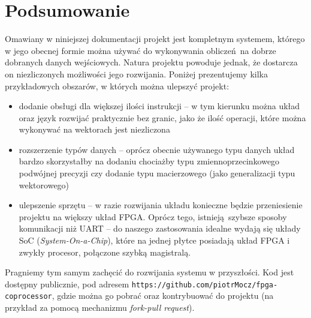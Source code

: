 \section{Podsumowanie}

Omawiany w niniejszej dokumentacji projekt jest kompletnym systemem, którego w jego obecnej formie można używać do wykonywania obliczeń na dobrze dobranych danych wejściowych. Natura projektu powoduje jednak, że dostarcza on niezliczonych możliwości jego rozwijania. Poniżej prezentujemy kilka przykładowych obszarów, w których można ulepszyć projekt:

\begin{itemize}
  \item dodanie obsługi dla większej ilości instrukcji -- w tym kierunku można układ oraz język rozwijać praktycznie bez granic, jako że ilość operacji, które można wykonywać na wektorach jest niezliczona
  \item rozszerzenie typów danych -- oprócz obecnie używanego typu danych układ bardzo skorzystałby na dodaniu chociażby typu zmiennoprzecinkowego podwójnej precyzji czy dodanie typu macierzowego (jako generalizacji typu wektorowego)
  \item ulepszenie sprzętu -- w razie rozwijania układu konieczne będzie przeniesienie projektu na większy układ FPGA. Oprócz tego, istnieją szybsze sposoby komunikacji niż UART -- do naszego zastosowania idealne wydają się układy SoC (\textit{System-On-a-Chip}), które na jednej płytce posiadają układ FPGA i zwykły procesor, połączone szybką magistralą.
\end{itemize}

Pragniemy tym samym zachęcić do rozwijania systemu w przyszłości. Kod jest dostępny publicznie, pod adresem \texttt{https://github.com/piotrMocz/fpga-coprocessor}, gdzie można go pobrać oraz kontrybuować do projektu (na przykład za pomocą mechanizmu \textit{fork-pull request}).
